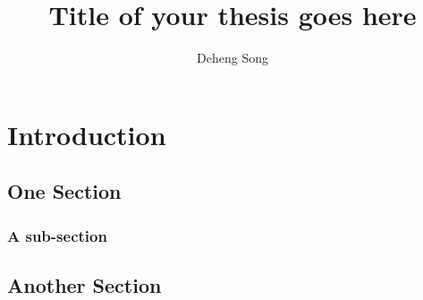 \documentclass[doublespace,draft,nopageskip]{VTthesis} %
\title{Title of your thesis goes here}
\author{Deheng Song}
\begin{document}
\frontmatter
\maketitle
\tableofcontents

\listoffigures
\listoftables





\mainmatter

\chapter{Introduction} \label{ch:introduction}
\lipsum[1]

\section{One Section} \label{se:one_section}
\lipsum[2]
\subsection{A sub-section} \label{ss:this_subsection}
\lipsum[1-4]
\section{Another Section} \label{se:another_section}
\lipsum[1-2]
\end{document}
